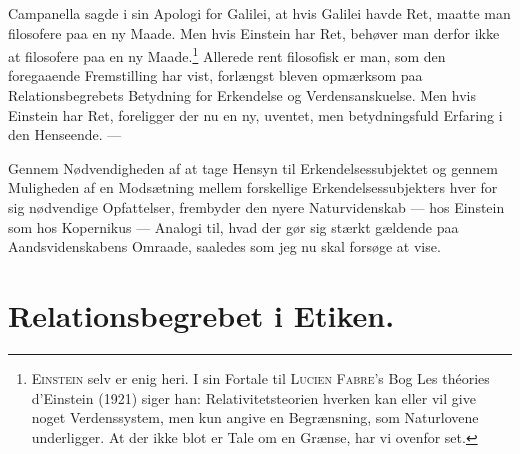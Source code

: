 \documentclass[12pt]{article}
\newcommand{\opage}[1]{\marginnote{\footnotesize\textit{[#1]}}}
\begin{document}
Campanella sagde i sin Apologi for Galilei, at hvis
\opage{77} \setcounter{footnote}{0}
Galilei havde Ret, maatte man filosofere paa en ny Maade.
Men hvis Einstein har Ret, behøver man derfor ikke at
filosofere paa en ny Maade.\footnote{\textsc{Einstein} selv er enig heri. I
sin Fortale til \textsc{Lucien Fabre}'s Bog \guillemotright Les théories
d'Einstein\guillemotleft{} (1921) siger han: \guillemotright
Relativitetsteorien hverken kan eller vil give noget Verdenssystem, men
kun angive en Begrænsning, som Naturlovene
underligger\guillemotleft. At der ikke blot er Tale om en Grænse, har
vi ovenfor set.}
Allerede rent filosofisk er man, som den foregaaende Fremstilling har
vist, forlængst bleven opmærksom paa Relationsbegrebets Betydning for
Erkendelse og Verdensanskuelse. Men hvis Einstein har Ret, foreligger
der nu en ny, uventet, men betydningsfuld Erfaring i den Henseende. ---

Gennem Nødvendigheden af at tage Hensyn til Erkendelsessubjektet og
gennem Muligheden af en Modsætning mellem forskellige
Erkendelsessubjekters hver for sig nødvendige Opfattelser, frembyder den
nyere Naturvidenskab --- hos Einstein som hos Kopernikus --- Analogi
til, hvad der gør sig stærkt gældende paa Aandsvidenskabens Omraade,
saaledes som jeg nu skal forsøge at vise.

\section{Relationsbegrebet i Etiken.}\label{sec:4}
\end{document}
